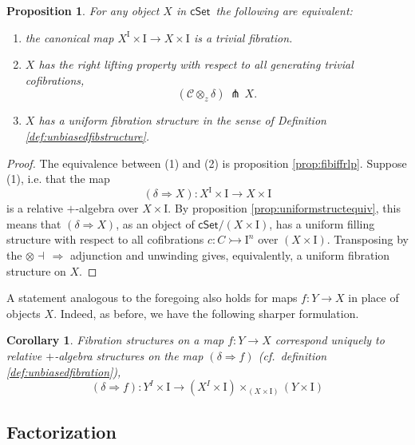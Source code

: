\documentclass[12pt]{article}
\newcommand{\cSet}{\ensuremath{\mathsf{cSet}}}
\newcommand{\mono}{\ensuremath{\rightarrowtail}}
\newcommand{\ra}{\ensuremath{\rightarrow}}
\newcommand{\too}{\ensuremath{\longrightarrow}}
\newcommand{\I}{\ensuremath{\mathrm{I}}}
\newtheorem{proposition}[theorem]{Proposition}
\newtheorem{corollary}[theorem]{Corollary}
\theoremstyle{remark}
\theoremstyle{definition}
\begin{document}
\begin{proposition}\label{prop:equivfibstruc} For any object $X$ in \cSet\ the following are equivalent:
\begin{enumerate}
\item the canonical map $X^\I\times \I \ra X\times \I$ is a trivial fibration. 

\item $X$ has the right lifting property with respect to all generating trivial cofibrations,
\[
(\mathcal{C}\otimes_z\delta)\, \pitchfork\,X.
\]

\item $X$ has a uniform fibration structure in the sense of Definition \ref{def:unbiasedfibstructure}.
\end{enumerate}
\end{proposition}

\begin{proof}
The equivalence between (1) and (2) is proposition \ref{prop:fibiffrlp}.  Suppose (1), i.e. that the map
\[
(\delta\Rightarrow\!X) : X^\I\times \I \ra X\times \I
\]
is a relative $+$-algebra over $X\times \I$.  By proposition \ref{prop:uniformstructequiv}, this means that $(\delta\Rightarrow\!X)$, as an object of $\cSet/(X\times \I)$, has a uniform filling structure with respect to all cofibrations $c :C\mono \I^n$ over $(X\times \I)$.  Transposing by the $\otimes\dashv\,\Rightarrow$ adjunction and unwinding gives, equivalently, a uniform fibration structure on $X$.
\end{proof}

A statement analogous to the foregoing also holds for maps $f:Y\ra X$ in place of objects $X$.  Indeed, as before, we have the following sharper formulation.

\begin{corollary}
Fibration structures on a map $f : Y\ra X$ correspond uniquely to relative $+$-algebra structures on the map $(\delta\Rightarrow{f})$ (cf.\ definition \ref{def:unbiasedfibration}),
\[
(\delta\Rightarrow{f}) : Y^I\times \I \too (X^I \times \I)\times_{(X\times \I)} (Y\times\I)
\]
\end{corollary}

\subsection{Factorization}\label{subsec:FWFS}
\end{document}
